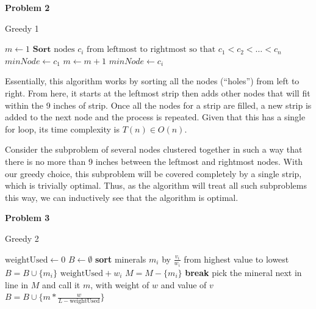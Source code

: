 \documentclass{article}
\newcommand{\Problem}[1]{\textbf{Problem #1}}
\begin{document}
\Problem{2}

\begin{algorithm}[H]
\caption{Greedy 1}
\begin{algorithmic}[1]
\State $m \gets 1$ 
\State $\textbf{Sort}\text{ nodes $c_i$ from leftmost to rightmost so that $c_1 < c_2 < \hdots < c_n$}$
\State $minNode \gets c_1$ 
\State $m \gets m+ 1$
\State $minNode \gets c_i $
\EndIf
\EndFor
\State {}
\EndProcedure
\end{algorithmic}
\end{algorithm}

Essentially, this algorithm works by sorting all the nodes (``holes'') from left to right.
From here, it starts at the leftmost strip then adds other nodes that will fit within the 9 inches of strip.
Once all the nodes for a strip are filled, a new strip is added to the next node and the process is repeated.
Given that this has a single for loop, its time complexity is $T(n) \in O(n)$.

Consider the subproblem of several nodes clustered together in such a way that there is no more than 9 inches between the leftmost and rightmost nodes.
With our greedy choice, this subproblem will be covered completely by a single strip, which is trivially optimal.
Thus, as the algorithm will treat all such subproblems this way, we can inductively see that the algorithm is optimal.

\Problem{3}

\begin{algorithm}[H]
\caption{Greedy 2}
\begin{algorithmic}[1]
\State $\text{weightUsed} \gets 0$
\State $B \gets \emptyset$
\State \textbf{sort} minerals $m_i$ by $\frac{v_i}{w_i}$ from highest value to lowest
\State $B = B \cup \{m_i\}$
\State $\text{weightUsed} + w_i$
\State $M = M - \{m_i\}$
\State \textbf{break}
\EndIf
\EndFor
{}
\State pick the mineral next in line in $M$ and call it $m$, with weight of $w$ and value of $v$
\State $B = B \cup \{m * \frac{w}{L - \text{weightUsed}}\}$
\EndIf
\State {}
\EndProcedure
\end{algorithmic}
\end{algorithm}
\end{document}
